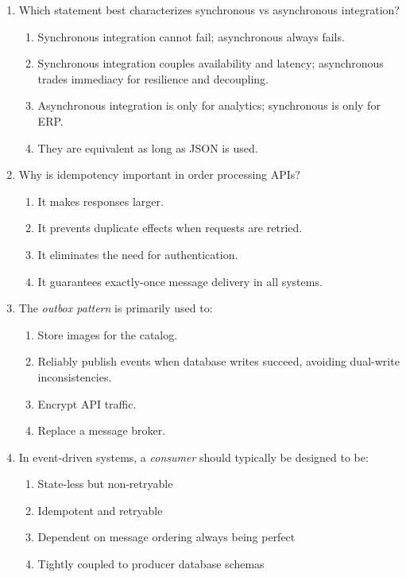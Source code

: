 \begin{enumerate}
  \item Which statement best characterizes synchronous vs asynchronous integration?
  \begin{enumerate}
    \item Synchronous integration cannot fail; asynchronous always fails.
    \item Synchronous integration couples availability and latency; asynchronous trades immediacy for resilience and decoupling.
    \item Asynchronous integration is only for analytics; synchronous is only for ERP.
    \item They are equivalent as long as JSON is used.
  \end{enumerate}

  \item Why is idempotency important in order processing APIs?
  \begin{enumerate}
    \item It makes responses larger.
    \item It prevents duplicate effects when requests are retried.
    \item It eliminates the need for authentication.
    \item It guarantees exactly-once message delivery in all systems.
  \end{enumerate}

  \item The \emph{outbox pattern} is primarily used to:
  \begin{enumerate}
    \item Store images for the catalog.
    \item Reliably publish events when database writes succeed, avoiding dual-write inconsistencies.
    \item Encrypt API traffic.
    \item Replace a message broker.
  \end{enumerate}

  \item In event-driven systems, a \emph{consumer} should typically be designed to be:
  \begin{enumerate}
    \item State-less but non-retryable
    \item Idempotent and retryable
    \item Dependent on message ordering always being perfect
    \item Tightly coupled to producer database schemas
  \end{enumerate}


\end{enumerate}
